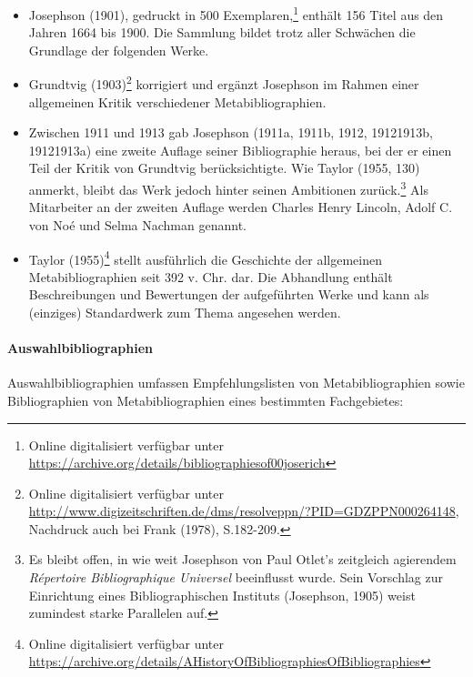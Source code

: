 \documentclass[a4paper,
fontsize=11pt,
oneside,
numbers=noperiodatend,
parskip=half-,
bibliography=totoc,
final
]{scrartcl}
\begin{document}
\begin{itemize}
\item
  Josephson (1901), gedruckt in 500 Exemplaren,\footnote{Online
    digitalisiert verfügbar unter
    \url{https://archive.org/details/bibliographiesof00joserich}}
  enthält 156 Titel aus den Jahren 1664 bis 1900. Die Sammlung bildet
  trotz aller Schwächen die Grundlage der folgenden Werke.
\item
  Grundtvig (1903)\footnote{Online digitalisiert verfügbar unter
    \url{http://www.digizeitschriften.de/dms/resolveppn/?PID=GDZPPN000264148},
    Nachdruck auch bei Frank (1978), S.182-209.} korrigiert und ergänzt
  Josephson im Rahmen einer allgemeinen Kritik verschiedener
  Metabibliographien.
\item
  Zwischen 1911 und 1913 gab Josephson (1911a, 1911b, 1912, 19121913b,
  19121913a) eine zweite Auflage seiner Bibliographie heraus, bei der er
  einen Teil der Kritik von Grundtvig berücksichtigte. Wie Taylor (1955,
  130) anmerkt, bleibt das Werk jedoch hinter seinen Ambitionen
  zurück.\footnote{Es bleibt offen, in wie weit Josephson von Paul
    Otlet's zeitgleich agierendem \emph{Répertoire Bibliographique
    Universel} beeinflusst wurde. Sein Vorschlag zur Einrichtung eines
    Bibliographischen Instituts (Josephson, 1905) weist zumindest starke
    Parallelen auf.} Als Mitarbeiter an der zweiten Auflage werden
  Charles Henry Lincoln, Adolf C. von Noé und Selma Nachman genannt.
\item
  Taylor (1955)\footnote{Online digitalisiert verfügbar unter
    \url{https://archive.org/details/AHistoryOfBibliographiesOfBibliographies}}
  stellt ausführlich die Geschichte der allgemeinen Metabibliographien
  seit 392 v. Chr. dar. Die Abhandlung enthält Beschreibungen und
  Bewertungen der aufgeführten Werke und kann als (einziges)
  Standardwerk zum Thema angesehen werden.
\end{itemize}

\paragraph{Auswahlbibliographien}\label{auswahlbibliographien}

Auswahlbibliographien umfassen Empfehlungslisten von Metabibliographien
sowie Bibliographien von Metabibliographien eines bestimmten
Fachgebietes:
\end{document}
